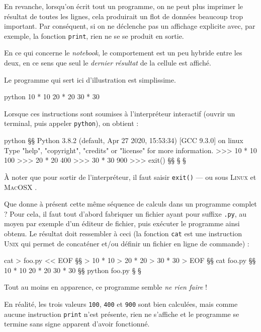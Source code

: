 En revanche, lorsqu'on écrit tout un programme, on ne peut plus imprimer le résultat de toutes les lignes, cela produirait un flot de données beaucoup trop important. Par conséquent, si on ne déclenche pas un affichage explicite avec, par exemple, la fonction \texttt{print}, rien ne se se produit en sortie.

En ce qui concerne le \textit{notebook}, le comportement est un peu hybride entre les deux, en ce sens que seul le \emph{dernier résultat} de la cellule est affiché.

Le programme qui sert ici d'illustration est simplissime.
\begin{listingbox}[after skip=6pt]{python}
10 * 10
20 * 20
30 * 30
\end{listingbox}

Lorsque ces instructions sont soumises à l'interpréteur interactif (ouvrir un terminal, puis appeler \texttt{python}), on obtient :
\vspace*{4pt}
\begin{ubuntu}
python §\startconsole§
Python 3.8.2 (default, Apr 27 2020, 15:53:34) 
[GCC 9.3.0] on linux
Type "help", "copyright", "credits" or "license" for more information.
>>> 10 * 10
100
>>> 20 * 20
400
>>> 30 * 30
900
>>> exit() §§
§ §
\end{ubuntu}
\vspace*{4pt}

À noter que pour sortir de l'interpréteur, il faut saisir \texttt{exit()} --- ou sous \textsc{Linux} et \textsc{MacOSX} .

Que donne à présent cette même séquence de calculs dans un programme complet ? Pour cela, il faut tout d'abord fabriquer un fichier ayant pour suffixe \texttt{.py}, au moyen par exemple d'un éditeur de fichier, puis exécuter le programme ainsi obtenu. Le résultat doit ressembler à ceci (la fonction \texttt{cat} est une instruction \textsc{Unix} qui permet de concaténer et/ou définir un fichier en ligne de commande) :
\vspace*{4pt}
\begin{ubuntu}
cat > foo.py << EOF §\startconsole§
> 10 * 10
> 20 * 20
> 30 * 30
> EOF §§
cat foo.py §\startconsole§
10 * 10
20 * 20
30 * 30 §§
python foo.py
§ §
\end{ubuntu}
\vspace*{4pt}

Tout au moins en apparence, ce programme semble \emph{ne rien faire} !

En réalité, les trois valeurs \texttt{100}, \texttt{400} et \texttt{900} sont bien calculées, mais comme aucune instruction \texttt{print} n'est présente, rien ne s'affiche et le programme se termine sans signe apparent d'avoir fonctionné.

